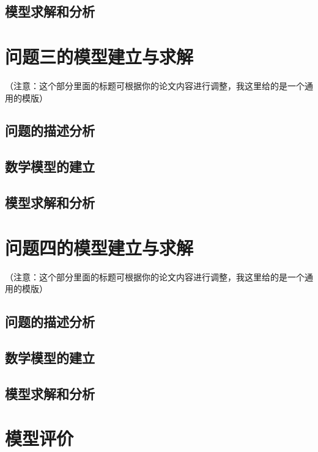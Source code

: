 \documentclass[a4paper,10pt]{my_paper}
\numberwithin{equation}{section}
\begin{document}
\subsection{模型求解和分析}


\section{问题三的模型建立与求解}
（注意：这个部分里面的标题可根据你的论文内容进行调整，我这里给的是一个通用的模版）

\subsection{问题的描述分析}

\subsection{数学模型的建立}

\subsection{模型求解和分析}

\section{问题四的模型建立与求解}
（注意：这个部分里面的标题可根据你的论文内容进行调整，我这里给的是一个通用的模版）

\subsection{问题的描述分析}

\subsection{数学模型的建立}

\subsection{模型求解和分析}

\section{模型评价}
\end{document}
